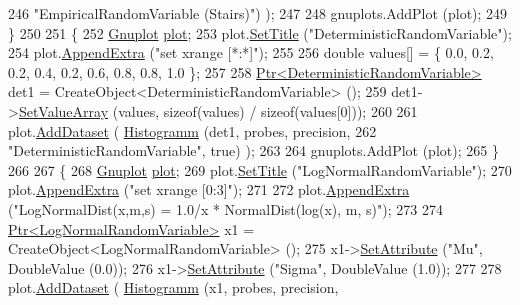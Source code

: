 \begin{DoxyCode}
246                                   \textcolor{stringliteral}{"EmpiricalRandomVariable (Stairs)"}) );
247 
248     gnuplots.AddPlot (plot);
249   \}
250 
251   \{
252     \hyperlink{classns3_1_1Gnuplot}{Gnuplot} \hyperlink{lte__amc_8m_a5942306abe9f005572e4344e3cdef528}{plot};
253     plot.\hyperlink{classns3_1_1Gnuplot_ac01f15633d49f0239f8a45293a1e04f0}{SetTitle} (\textcolor{stringliteral}{"DeterministicRandomVariable"});
254     plot.\hyperlink{classns3_1_1Gnuplot_a649a3041b9d0ea21a212b5ad9b28ecbf}{AppendExtra} (\textcolor{stringliteral}{"set xrange [*:*]"});
255 
256     \textcolor{keywordtype}{double} values[] = \{ 0.0, 0.2, 0.2, 0.4, 0.2, 0.6, 0.8, 0.8, 1.0 \};
257 
258     \hyperlink{classns3_1_1Ptr}{Ptr<DeterministicRandomVariable>} det1 = 
      CreateObject<DeterministicRandomVariable> ();
259     det1->\hyperlink{classns3_1_1DeterministicRandomVariable_af705c5489a2cb8dd541b1f460c344804}{SetValueArray} (values, \textcolor{keyword}{sizeof}(values) / \textcolor{keyword}{sizeof}(values[0]));
260 
261     plot.\hyperlink{classns3_1_1Gnuplot_a306ec724a327cf9ab699700f31fca0a1}{AddDataset} ( \hyperlink{main-random-variable_8cc_a2cfd3837ab3f2e816cf53486d7a186b5}{Histogramm} (det1, probes, precision,
262                                   \textcolor{stringliteral}{"DeterministicRandomVariable"}, \textcolor{keyword}{true}) );
263 
264     gnuplots.AddPlot (plot);
265   \}
266 
267   \{
268     \hyperlink{classns3_1_1Gnuplot}{Gnuplot} \hyperlink{lte__amc_8m_a5942306abe9f005572e4344e3cdef528}{plot};
269     plot.\hyperlink{classns3_1_1Gnuplot_ac01f15633d49f0239f8a45293a1e04f0}{SetTitle} (\textcolor{stringliteral}{"LogNormalRandomVariable"});
270     plot.\hyperlink{classns3_1_1Gnuplot_a649a3041b9d0ea21a212b5ad9b28ecbf}{AppendExtra} (\textcolor{stringliteral}{"set xrange [0:3]"});
271 
272     plot.\hyperlink{classns3_1_1Gnuplot_a649a3041b9d0ea21a212b5ad9b28ecbf}{AppendExtra} (\textcolor{stringliteral}{"LogNormalDist(x,m,s) = 1.0/x * NormalDist(log(x), m, s)"});
273 
274     \hyperlink{classns3_1_1Ptr}{Ptr<LogNormalRandomVariable>} x1 = CreateObject<LogNormalRandomVariable> ();
275     x1->\hyperlink{classns3_1_1ObjectBase_ac60245d3ea4123bbc9b1d391f1f6592f}{SetAttribute} (\textcolor{stringliteral}{"Mu"}, DoubleValue (0.0));
276     x1->\hyperlink{classns3_1_1ObjectBase_ac60245d3ea4123bbc9b1d391f1f6592f}{SetAttribute} (\textcolor{stringliteral}{"Sigma"}, DoubleValue (1.0));
277 
278     plot.\hyperlink{classns3_1_1Gnuplot_a306ec724a327cf9ab699700f31fca0a1}{AddDataset} ( \hyperlink{main-random-variable_8cc_a2cfd3837ab3f2e816cf53486d7a186b5}{Histogramm} (x1, probes, precision,

\end{DoxyCode}
